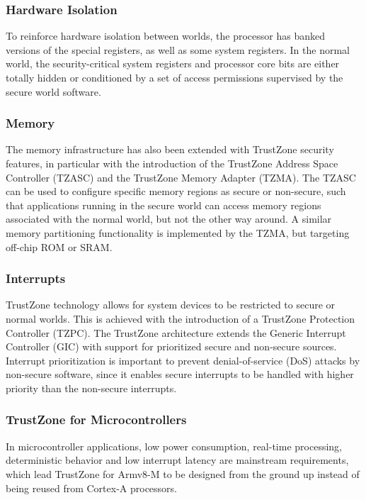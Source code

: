 \documentclass{article}
\begin{document}
\subsubsection{Hardware Isolation}

To reinforce hardware isolation between worlds, the processor has banked versions of the special registers, as well as some system registers. In the normal world, the security-critical system registers and processor core bits are either totally hidden or conditioned by a set of access permissions supervised by the secure world software.

\subsubsection{Memory}

The memory infrastructure has also been extended with TrustZone security features, in particular with the introduction of the TrustZone Address Space Controller (TZASC) and the TrustZone Memory Adapter (TZMA). The TZASC can be used to configure specific memory regions as secure or non-secure, such that applications running in the secure world can access memory regions associated with the normal world, but not the other way around. A similar memory partitioning functionality is implemented by the TZMA, but targeting off-chip ROM or SRAM.

\subsubsection{Interrupts}

TrustZone technology allows for system devices to be restricted to secure or normal worlds. This is achieved with the introduction of a TrustZone Protection Controller (TZPC). The TrustZone architecture extends the Generic Interrupt Controller (GIC) with support for prioritized secure and non-secure sources. Interrupt prioritization is important to prevent denial-of-service (DoS) attacks by non-secure software, since it enables secure interrupts to be handled with higher priority than the non-secure interrupts.

\subsubsection{TrustZone for Microcontrollers}

In microcontroller applications, low power consumption, real-time processing, deterministic behavior and low interrupt latency are mainstream requirements, which lead TrustZone for Armv8-M to be designed from the ground up instead of being reused from Cortex-A processors.
\end{document}
